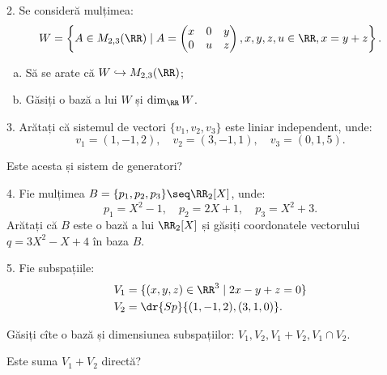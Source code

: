 \vspace{1cm}

2. Se consideră mulțimea:
\[
    W = \left\{ A \in M_{2, 3}(\RR) \mid A = \begin{pmatrix} x & 0 & y \\ 0 & u & z \end{pmatrix},
    x, y, z, u \in \RR, x = y + z \right\}.
\]
\begin{enumerate}[(a)]
    \item Să se arate că $ W \hookrightarrow M_{2, 3}(\RR) $;
    \item Găsiți o bază a lui $ W $ și $ \dim_\RR W $.
\end{enumerate}

\vspace{1cm}

3. Arătați că sistemul de vectori $ \{v_1, v_2, v_3 \} $ este liniar independent,
unde:
\[
    v_1 = (1, -1, 2), \quad v_2 = (3, -1, 1), \quad v_3 = (0, 1, 5).
\]

Este acesta și sistem de generatori?

\vspace{1cm}

4. Fie mulțimea $ B = \{ p_1, p_2, p_3 \} \seq \RR_2[X] $, unde:
\[
    p_1 = X^2 - 1, \quad p_2 = 2X + 1, \quad p_3 = X^2 + 3.
\]
Arătați că $ B $ este o bază a lui $ \RR_2[X] $ și găsiți coordonatele
vectorului $ q = 3X^2 - X + 4 $ în baza $ B $.

\vspace{1cm}

5. Fie subspațiile:
\begin{align*}
    V_1 &= \{ (x, y, z) \in \RR^3 \mid 2x - y + z = 0 \} \\
    V_2 &= \dr{Sp} \{ (1, -1, 2), (3, 1, 0) \}.
\end{align*}

Găsiți cîte o bază și dimensiunea subspațiilor: $ V_1, V_2, V_1 + V_2, V_1 \cap V_2 $.

Este suma $ V_1 + V_2 $ directă?

\vspace{1cm}

